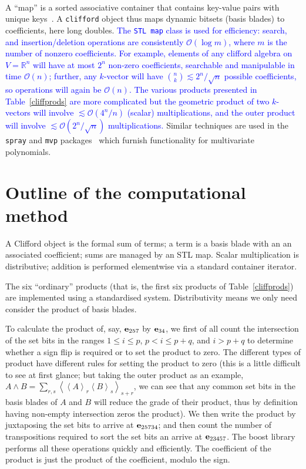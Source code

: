 \documentclass{birkjour}
\theoremstyle{definition}
\theoremstyle{remark}
\numberwithin{equation}{section}
\begin{document}
{\ }\\[10pt]

A ``map'' is a sorted associative container that contains key-value
pairs with unique keys~\cite{musser2009}.  A {\tt clifford} object
thus maps dynamic bitsets (basis blades) to coefficients, here long
doubles.  \textcolor{blue}{The {\tt STL map} class is used for
  efficiency: search, and insertion/deletion operations are
  consistently $\mathcal{O}(\log m)$, where $m$ is the number of
  nonzero coefficients.  For example, elements of any clifford algebra
  on $V=\mathbb{R}^n$ will have at most $2^n$ non-zero coefficients,
  searchable and manipulable in time $\mathcal{O}(n)$; further, any
  $k$-vector will have ${n\choose k}\lesssim 2^n/\sqrt{n}$ possible
  coefficients, so operations will again be $\mathcal{O}(n)$.  The
  various products presented in Table~\ref{cliffprods} are more
  complicated but the geometric product of two $k$-vectors will
  involve $\lesssim\mathcal{O}(4^n/n)$ (scalar) multiplications, and
  the outer product will involve $\lesssim\mathcal{O}(2^n/\sqrt{n})$
  multiplications.}  Similar techniques are used in the {\tt spray}
and {\tt mvp} packages~\cite{hankin2022_mvp,hankin2022_spray} which
furnish functionality for multivariate polynomials.

\section{Outline of the computational method}

A Clifford object is the formal sum of terms; a term is a basis blade
with an an associated coefficient; sums are managed by an STL map.
Scalar multiplication is distributive; addition is performed
elementwise via a standard container iterator.

The six ``ordinary'' products (that is, the first six products of
Table~\ref{cliffprods}) are implemented using a standardised system.
Distributivity means we only need consider the product of basis
blades.

To calculate the product of, say, ${\bf e}_{257}$ by ${\bf e}_{34}$, we first of
all count the intersection of the set bits in the ranges $1\leqslant
i\leqslant p$, $p<i\leqslant p+q$, and $i >p+q$ to determine whether a sign flip
is required or to set the product to zero.  The different types of
product have different rules for setting the product to zero (this is
a little difficult to see at first glance; but taking the outer
product as an example, $\displaystyle A\wedge
B=\sum_{r,s}\left\langle\left\langle A\right\rangle_r\left\langle
B\right\rangle_s\right\rangle_{s+r}$, we can see that any common set
bits in the basis blades of $A$ and $B$ will reduce the grade of their
product, thus by definition having non-empty intersection zeros the
product).  We then write the product by juxtaposing the set bits to
arrive at ${\bf e}_{25734}$; and then count the number of transpositions
required to sort the set bits an arrive at ${\bf e}_{23457}$.  The boost
library performs all these operations quickly and efficiently.  The
coefficient of the product is just the product of the coefficient,
modulo the sign.
\end{document}
